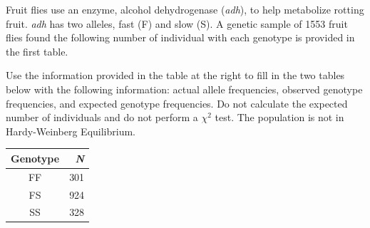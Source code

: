 
\question[15]
Fruit flies use an enzyme, alcohol dehydrogenase (\emph{adh}), to help metabolize rotting fruit. \emph{adh} has two alleles, fast (F) and slow (S).  A genetic sample of 1553 fruit flies found the following number of individual with each genotype is provided in the first table.

\vspace{\baselineskip}

\begin{minipage}{0.6\linewidth}
Use the information provided in the table at the right to fill in the two tables below with the following information: actual allele frequencies, observed genotype frequencies, and expected genotype frequencies.  Do not calculate the expected number of individuals and do not perform a $\chi^2$ test. The population is not in Hardy-Weinberg Equilibrium.
\end{minipage}\hfill
\begin{minipage}{0.3\linewidth}
	\begin{tabular}{cr}
	\toprule
	Genotype	&	\emph{N}\\
	\midrule
	FF	&	301\\
	FS	&	924\\
	SS	&	328\\
	\bottomrule
	\end{tabular}\vfill
\end{minipage}

\vspace{\baselineskip}

